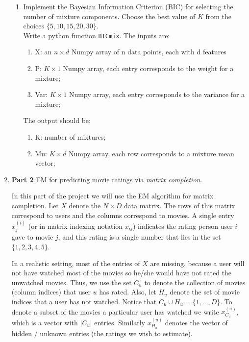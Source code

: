 \begin{enumerate}
\begin{enumerate}
\item Implement the Bayesian Information Criterion (BIC) for selecting the number of mixture components. Choose the best value of $K$ from the choices $\{ 5, 10, 15, 20 , 30\}$.\\
    Write a python function \texttt{BICmix}. The inputs are:
    \begin{enumerate}
    \item X: an $n \times d$ Numpy array of n data points, each with d features
    \item P: $K \times 1$ Numpy array, each entry corresponds to the weight for a mixture;
    \item Var: $K \times 1$ Numpy array, each entry corresponds to the variance for a mixture;
    \end{enumerate}
    The output should be:
    \begin{enumerate}
    \item K: number of mixtures; 
    \item Mu: $K \times d$ Numpy array, each row corresponds to a mixture mean vector;
    \end{enumerate}

\end{enumerate}

\item {\bf Part 2} EM for predicting movie ratings via \emph{matrix completion}.

In this part of the project we will use the EM algorithm for matrix completion. Let $X$ denote the $N \times D$ data matrix. The rows of this matrix correspond to users and the columns correspond to movies. A single entry $x^{(i)}_{j}$ (or in matrix indexing notation $x_{ij}$) indicates the rating person user $i$ gave to movie $j$, and this rating is a single number that lies in the set $\{1,2,3,4,5\}$.

In a realistic setting, most of the entries of $X$ are missing, because a user will not have watched most of the movies so he/she would have not rated the unwatched movies. Thus, we use the set $C_{u}$ to denote the collection of movies (column indices) that user $u$ has rated. Also, let $H_{u}$ denote the set of movie indices that a user has not watched. Notice that $C_{u} \cup H_{u} = \{1,\ldots,D\}$. To denote a subset of the movies a particular user has watched we write $x_{C_u}^{(u)}$, which is a vector with $|C_u|$ entries. Similarly $x_{H_u}^{(u)}$ denotes the vector of hidden / unknown entries (the ratings we wish to estimate).


\end{enumerate}
